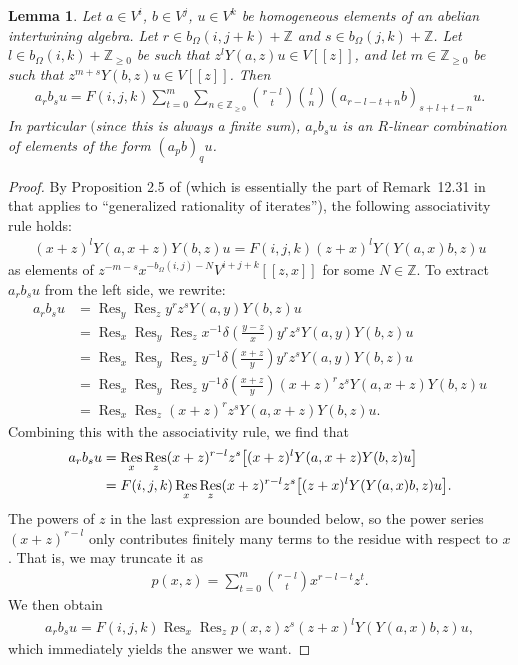 \documentclass[11pt]{article}
\newcommand{\bZ}{\mathbb{Z}}
\DeclareMathOperator{\Res}{Res}
\newtheorem{lem}[thm]{Lemma}
\theoremstyle{definition}
\begin{document}
\begin{lem} \label{lem:shorten-words}
Let $a \in V^i$, $b \in V^j$, $u \in V^k$ be homogeneous elements of an abelian intertwining algebra. Let $r \in b_\Omega(i,j+k)+\bZ$ and $s \in b_\Omega(j,k) + \bZ$. Let $l \in b_\Omega(i,k) + \bZ_{\geq 0}$ be such that $z^l Y(a,z) u \in V[[z]]$, and let $m \in \bZ_{\geq 0}$ be such that $z^{m+s} Y(b,z)u \in V[[z]]$. Then
\begin{gather*} a_r b_s u = F(i,j,k) \sum_{t=0}^m \sum_{n \in \bZ_{\geq 0}} \binom{r-l}{t} \binom{l}{n} (a_{r-l-t+n}b)_{s+l+t-n} u.\end{gather*}
In particular $($since this is always a finite sum$)$, $a_r b_s u$ is an $R$-linear combination of elements of the form $(a_p b)_q u$.
\end{lem}
\begin{proof}By Proposition 2.5 of \cite{L99a} (which is essentially the part of Remark~12.31 in~\cite{DL93} that applies to ``generalized rationality of iterates''), the following associativity rule holds:
\begin{gather*} (x + z)^l Y(a, x + z)Y(b,z)u = F(i,j,k)(z + x)^l Y(Y(a, x)b, z)u \end{gather*}
as elements of $z^{-m-s}x^{-b_\Omega(i,j)-N}V^{i+j+k}[[z,x]]$ for some $N \in \bZ$.
To extract $a_r b_s u$ from the left side, we rewrite:
\begin{align*}
a_r b_s u &= \Res_{y} \Res_{z} y^r z^s Y(a,y) Y(b,z)u \\
&= \Res_{x} \Res_{y} \Res_{z} x^{-1} \delta\left(\frac{y-z}{x} \right) y^r z^s Y(a,y) Y(b,z)u \\
&= \Res_{x} \Res_{y} \Res_{z} y^{-1} \delta\left(\frac{x+z}{y} \right) y^r z^s Y(a,y) Y(b,z)u \\
&= \Res_{x} \Res_{y} \Res_{z} y^{-1} \delta\left(\frac{x+z}{y} \right) (x+z)^r z^s Y(a,x + z) Y(b,z)u \\
&= \Res_{x} \Res_{z} (x+z)^r z^s Y(a,x + z) Y(b,z)u.
\end{align*}
Combining this with the associativity rule, we find that
 \begin{gather*}\begin{split}&
a_r b_s u = \Res_{x} \Res_{z} (x+z)^{r-l} z^s \big[(x+z)^l Y(a,x + z) Y(b,z)u \big] \\
& \hphantom{a_r b_s u }{}= F(i,j,k) \Res_{x} \Res_{z} (x+z)^{r-l} z^s \big[(z+x)^l Y(Y(a, x)b, z)u \big].\end{split}
\end{gather*}
The powers of $z$ in the last expression are bounded below, so the power series $(x+z)^{r-l}$ only contributes finitely many terms to the residue with respect to $x$. That is, we may truncate it as
\begin{gather*} p(x,z) = \sum_{t=0}^m \binom{r-l}{t} x^{r-l-t} z^t.\end{gather*}
We then obtain
\begin{gather*} a_r b_s u = F(i,j,k) \Res_{x} \Res_{z} p(x,z) z^s (z+x)^l Y(Y(a, x)b, z)u ,\end{gather*}
which immediately yields the answer we want.
\end{proof}
\end{document}
